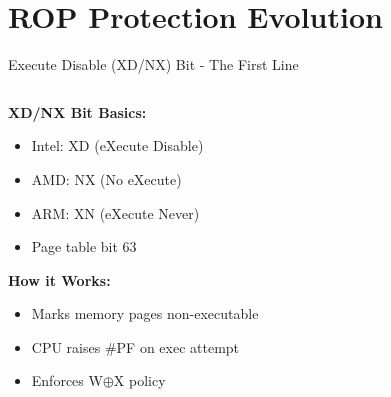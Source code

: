\documentclass[aspectratio=169,12pt]{beamer}
\begin{document}
\section{ROP Protection Evolution}

\begin{frame}{Execute Disable (XD/NX) Bit - The First Line}
    \begin{columns}
        \begin{column}{0.5\textwidth}
            \textbf{XD/NX Bit Basics:}
            \begin{itemize}
                \item Intel: XD (eXecute Disable)
                \item AMD: NX (No eXecute)
                \item ARM: XN (eXecute Never)
                \item Page table bit 63
            \end{itemize}
            
            \vspace{0.3cm}
            \textbf{How it Works:}
            \begin{itemize}
                \item Marks memory pages non-executable
                \item CPU raises \#PF on exec attempt
                \item Enforces W$\oplus$X policy
            \end{itemize}
        \end{column}
        \begin{column}{0.5\textwidth}
\end{column}
\end{columns}
\end{frame}
\end{document}
